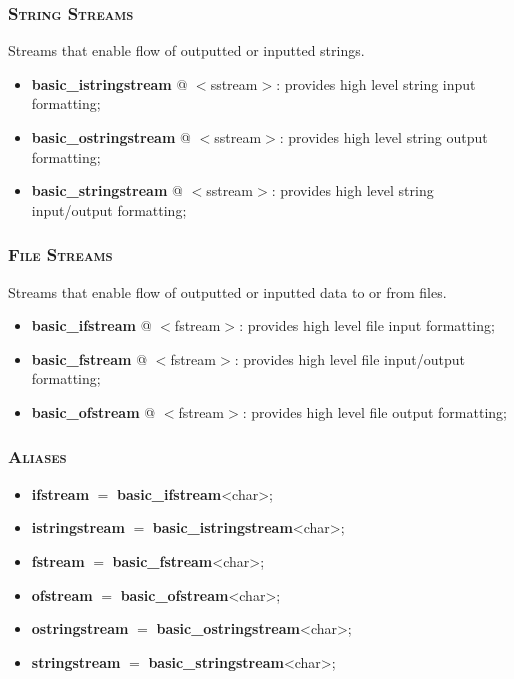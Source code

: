 \documentclass[10pt]{article}
\begin{document}
\begin{multicols*}{4}
{\subsubsection*{\textsc{String Streams}}
\noindent
Streams that enable flow of outputted or inputted strings.

\begin{itemize}[leftmargin=*,topsep=0.25pt]
  \setlength\itemsep{-1.8pt}
	\item \textbf{basic\_istringstream} @ $<$sstream$>$: provides high level string input formatting;
	\item \textbf{basic\_ostringstream} @ $<$sstream$>$: provides high level string output formatting;
	\item \textbf{basic\_stringstream} @ $<$sstream$>$: provides high level string input/output formatting;
\end{itemize}


\subsubsection*{\textsc{File Streams}} 
\noindent
Streams that enable flow of outputted or inputted data to or from files.

\begin{itemize}[leftmargin=*,topsep=0.25pt]
  \setlength\itemsep{-1.8pt}
	\item \textbf{basic\_ifstream} @ $<$fstream$>$: provides high level file input formatting;
	\item \textbf{basic\_fstream} @ $<$fstream$>$: provides high level file input/output formatting;
	\item \textbf{basic\_ofstream} @ $<$fstream$>$: provides high level file output formatting;
\end{itemize}

\subsubsection*{\textsc{Aliases}} 
\begin{itemize}[leftmargin=*,topsep=0.25pt]
  \setlength\itemsep{-1.8pt}
	\item \textbf{ifstream} $=$ \textbf{basic\_ifstream}<char>;
	\item \textbf{istringstream} $=$ \textbf{basic\_istringstream}<char>;
	\item \textbf{fstream} $=$ \textbf{basic\_fstream}<char>;
	\item \textbf{ofstream} $=$ \textbf{basic\_ofstream}<char>;
	\item \textbf{ostringstream} $=$ \textbf{ba\-sic\_o\-string\-stream}\-<char>;
	\item \textbf{stringstream} $=$ \textbf{basic\_stringstream}<char>;
\end{itemize}


}
\end{multicols*}
\end{document}
